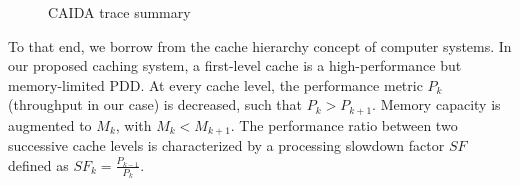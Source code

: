 \begin{figure}[]
	\begin{adjustwidth}{-0.80cm}{}
		\centering
		\caption{CAIDA trace summary}
		\label{fig:traces}
	\end{adjustwidth}
\end{figure}


To that end, we borrow from the cache hierarchy concept of computer systems.
In our proposed caching system, a first-level cache is a high-performance but memory-limited PDD.
At every cache level, the performance metric $P_{k}$ (throughput in our case) is decreased, such that $P_{k} > P_{k+1}$.
Memory capacity is augmented to $M_{k}$, with $M_{k} < M_{k+1}$. 
The performance ratio between two successive cache levels is characterized by a processing slowdown factor $SF$ defined as $SF_{k} = \frac{P_{k-1}}{P_{k}}$.


